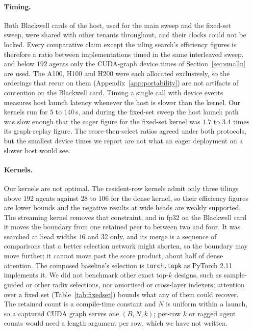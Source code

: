 \paragraph{Timing.} Both Blackwell cards of the host, used for the main sweep
and the fixed-set sweep, were shared with other tenants throughout, and their
clocks could not be locked. Every comparative claim except the tiling search's efficiency figures is
therefore a ratio between
implementations timed in the same interleaved sweep, and below $192$ agents only
the CUDA-graph device times of Section~\ref{sec:smalln} are used. The A100, H100
and H200 were each allocated exclusively, so the orderings that recur on them
(Appendix~\ref{app:portability}) are not artifacts of contention on the
Blackwell card. Timing a single call with device events measures host launch
latency whenever the host is slower than the kernel. Our kernels run for $5$ to
$140$\,\textmu s, and during the fixed-set sweep the host launch path was slow
enough that the eager figure for the fixed-set kernel was $1.7$ to $3.4$ times its graph-replay figure. The score-then-select ratios agreed under both
protocols, but the smallest device times we report are not what an eager
deployment on a slower host would see.

\paragraph{Kernels.} Our kernels are not optimal. The resident-row kernels
admit only three tilings above $192$ agents against $28$ to $106$ for the dense kernel, so their efficiency figures are lower bounds and the negative results
at wide heads are weakly supported. The streaming kernel removes that
constraint, and in fp32 on the Blackwell card it moves the boundary from one
retained peer to between two and four. It was searched at head widths $16$ and
$32$ only, and its merge is a sequence of comparisons that a better selection
network might shorten, so the boundary may move further; it cannot move past the
score product, about half of dense attention. The composed baseline's selection
is \texttt{torch.topk} as PyTorch 2.11 implements it. We did not benchmark other
exact top-$k$ designs, such as sample-guided or other radix selections, nor
amortised or cross-layer indexers; attention over a fixed set
(Table~\ref{tab:fixedset}) bounds what any of them could recover. The retained
count is a compile-time constant and $N$ is uniform within a launch, so a
captured CUDA graph serves one $(B, N, k)$; per-row $k$ or ragged agent counts
would need a length argument per row, which we have not written.

